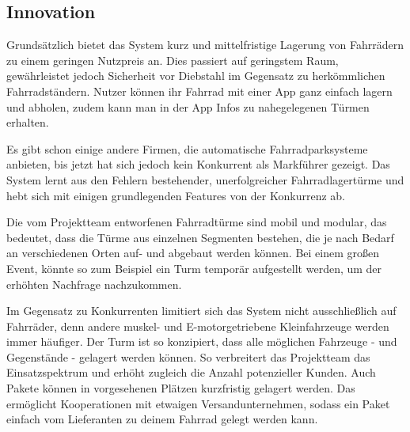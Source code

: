 \subsection{Innovation}

Grundsätzlich bietet das System kurz und mittelfristige Lagerung von Fahrrädern zu einem geringen Nutzpreis an. Dies passiert auf geringstem Raum, gewährleistet jedoch Sicherheit vor Diebstahl im Gegensatz zu herkömmlichen Fahrradständern. Nutzer können ihr Fahrrad mit einer App ganz einfach lagern und abholen, zudem kann man in der App Infos zu nahegelegenen Türmen erhalten.


Es gibt schon einige andere Firmen, die automatische Fahrradparksysteme anbieten, bis jetzt hat sich jedoch kein Konkurrent als Markführer gezeigt. Das System lernt aus den Fehlern bestehender, unerfolgreicher Fahrradlagertürme und hebt sich mit einigen grundlegenden Features von der Konkurrenz ab.


Die vom Projektteam entworfenen Fahrradtürme sind mobil und modular, das bedeutet, dass die Türme aus einzelnen Segmenten bestehen, die je nach Bedarf an verschiedenen Orten auf- und abgebaut werden können. Bei einem großen Event, könnte so zum Beispiel ein Turm temporär aufgestellt werden, um der erhöhten Nachfrage nachzukommen.


Im Gegensatz zu Konkurrenten limitiert sich das System nicht ausschließlich auf Fahrräder, denn andere muskel- und E-motorgetriebene Kleinfahrzeuge werden immer häufiger. Der Turm ist so konzipiert, dass alle möglichen Fahrzeuge - und Gegenstände - gelagert werden können. So verbreitert das Projektteam das Einsatzspektrum und erhöht zugleich die Anzahl potenzieller Kunden. Auch Pakete können in vorgesehenen Plätzen kurzfristig gelagert werden. Das ermöglicht Kooperationen mit etwaigen Versandunternehmen, sodass ein Paket einfach vom Lieferanten zu deinem Fahrrad gelegt werden kann.

